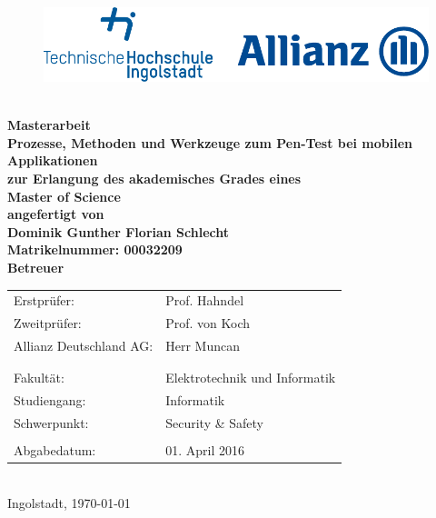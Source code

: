 
\begin{titlepage}

\phantom{tmpText}

\vspace{1cm}

\begin{figure}[h!]
\centering
\includegraphics[width=\textwidth]{bilder/thi_allianz_logo}
\end{figure}

  \begin{center}

    $ $
    \\[3ex]
    \textbf{{\large Masterarbeit} \\[3ex]
    {\LARGE Prozesse, Methoden und Werkzeuge zum Pen-Test bei mobilen Applikationen}\\[6ex]
    zur Erlangung des akademisches Grades eines \\
    Master of Science\\[2ex]
    \vfill
    angefertigt von \\
    Dominik Gunther Florian Schlecht \\
    {\small \normalfont Matrikelnummer: 00032209}\\[2ex] %
    \vfill
    Betreuer} \\[2ex]
    \begin{tabular}{ll}
      Erstprüfer: & Prof. Hahndel \\
      Zweitprüfer: & Prof. von Koch \\
      Allianz Deutschland AG: & Herr Muncan\\
      \\
      \\
      Fakultät: & Elektrotechnik und Informatik\\
      Studiengang: & Informatik\\
      Schwerpunkt: & Security \& Safety\\
      \\
      Abgabedatum: & 01. April 2016
    \end{tabular} \\[2ex]
    \vfill
    Ingolstadt, \today
  \end{center}
\end{titlepage}
